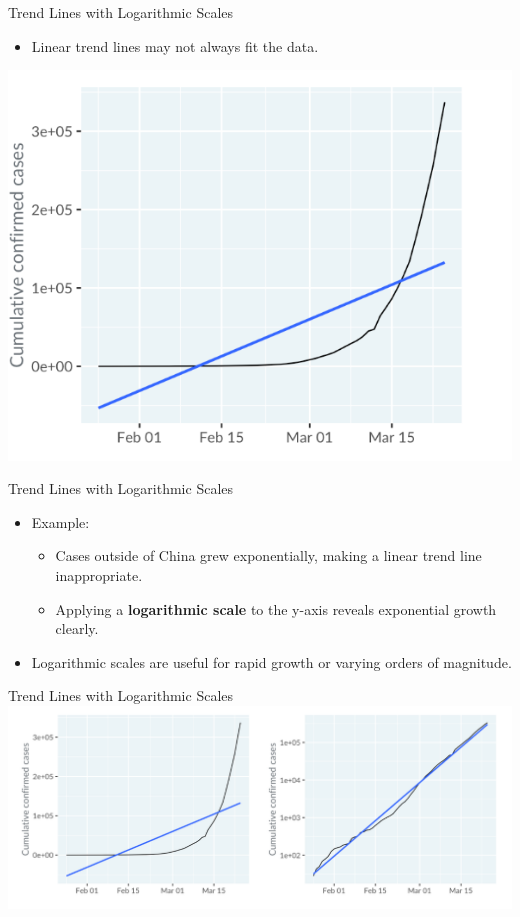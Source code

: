 \documentclass[
  ignorenonframetext,
]{beamer}
\providecommand{\tightlist}{%
  \setlength{\itemsep}{0pt}\setlength{\parskip}{0pt}}
\begin{document}
\begin{frame}{Trend Lines with Logarithmic Scales}
\label{trend-lines-with-logarithmic-scales}
\begin{itemize}
\tightlist
\item
  Linear trend lines may not always fit the data.
\end{itemize}

\includegraphics{../images/im44.png}
\end{frame}

\begin{frame}{Trend Lines with Logarithmic Scales}
\label{trend-lines-with-logarithmic-scales-1}
\begin{itemize}
\item
  Example:

  \begin{itemize}
  \item
    Cases outside of China grew exponentially, making a linear trend
    line inappropriate.
  \item
    Applying a \textbf{logarithmic scale} to the y-axis reveals
    exponential growth clearly.
  \end{itemize}
\item
  Logarithmic scales are useful for rapid growth or varying orders of
  magnitude.
\end{itemize}
\end{frame}

\begin{frame}{Trend Lines with Logarithmic Scales}
\label{trend-lines-with-logarithmic-scales-2}
\includegraphics{../images/im45.png}
\end{frame}
\end{document}
